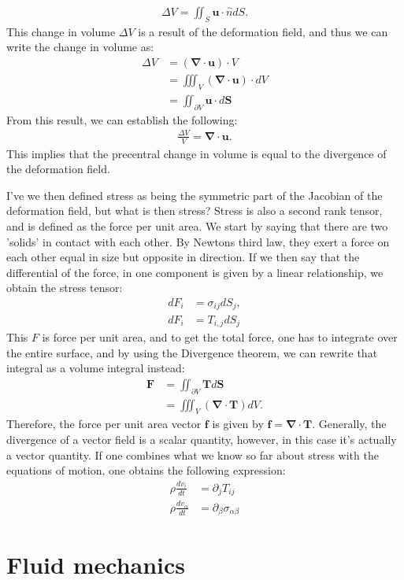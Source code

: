 \documentclass[a4paper]{article}
\newcommand{\dive}[1]{\mathbf{\nabla}\cdot \mathbf{#1}}
\begin{document}
\begin{align*}
    \Delta V = \iint_{S}\mathbf{u}\cdot\hat{n}dS.
\end{align*}This change in volume $\Delta V$ is a result of the deformation field, and thus we can write the change in volume as:
\begin{align*}
    \Delta V &= \left(\dive{u}\right)\cdot V\\
    &= \iiint_{V} \left(\dive{u}\right)\cdot dV\\
    &= \iint_{\partial V}\mathbf{u}\cdot d\mathbf{S}
\end{align*}From this result, we can establish the following:
\begin{align*}
    \frac{\Delta V}{V} = \dive{u}.
\end{align*} This implies that the precentral change in volume is equal to the divergence of the deformation field.

\vspace*{0.5cm}\noindent
I've we then defined stress as being the symmetric part of the Jacobian of the deformation field, but what is then stress? 
Stress is also a second rank tensor, and is defined as the force per unit area. We start by saying that there are two 'solids' in contact with each other.
By Newtons third law, they exert a force on each other equal in size but opposite in direction. If we then say that the differential of the force, in one component is given by a linear relationship, we obtain the stress tensor:
\begin{align*}
    dF_i &= \sigma_{ij}dS_j,\\
    dF_i &= T_{i,j}dS_j
\end{align*}This $F$ is force per unit area, and to get the total force, one has to integrate over the entire surface, and by using the Divergence theorem, we can rewrite that integral as a volume integral instead:
\begin{align*}
    \mathbf{F} &= \iint_{\partial V}\mathbf{T}d\mathbf{S}\\
    &=\iiint_{V}\left(\dive{T}\right)dV.
\end{align*}Therefore, the force per unit area vector $\mathbf{f}$ is given by $\mathbf{f} = \dive{T}$. Generally, the divergence of a vector field is a scalar quantity, however, in this case it's actually a vector quantity.
If one combines what we know so far about stress with the equations of motion, one obtains the following expression:
\begin{align*}
    \rho\frac{d v_i}{dt} &=\partial_jT_{ij}\\
    \rho\frac{dv_\alpha}{dt} &= \partial_\beta\sigma_{\alpha\beta}
\end{align*}


\section{Fluid mechanics}\label{sec: Fluid mechanics}
\end{document}
